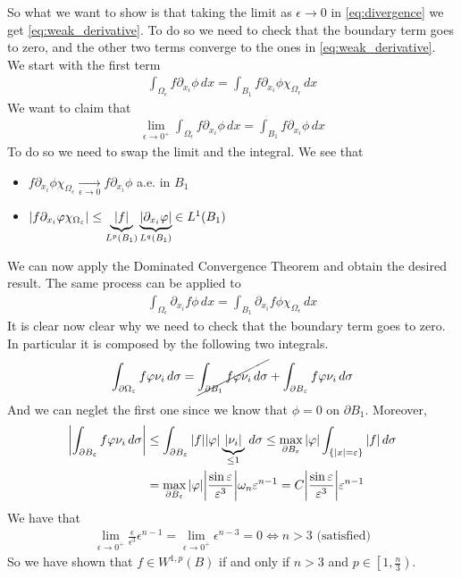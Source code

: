 So what we want to show is that taking the limit as \(\epsilon \to 0\) in \eqref{eq:divergence} we get \eqref{eq:weak_derivative}. 
To do so we need to check that the boundary term goes to zero, and the other two terms converge to the ones in \eqref{eq:weak_derivative}. \\
We start with the first term
\[ 
    \begin{split}
        \int_{\Omega_\epsilon} f \partial_{x_i} \phi \, dx = \int_{B_1} f \partial_{x_i} \phi \chi_{\Omega_\epsilon} \, dx
    \end{split}
\]
We want to claim that 
\[
    \begin{split}
        \lim_{\epsilon \to 0^+} \int_{\Omega_\epsilon} f \partial_{x_i} \phi \, dx = \int_{B_1} f \partial_{x_i} \phi \, dx
    \end{split}
\]
To do so we need to swap the limit and the integral. We see that 
\begin{itemize}
    \item \(f \partial_{x_i} \phi \chi_{\Omega_\epsilon} \underset{\epsilon \to 0}{\longrightarrow} f \partial_{x_i} \phi\) a.e. in \(B_1\)
    \item \(\abs{f \partial_{x_i} \phi \chi_{\Omega_\epsilon}} \leq \underbrace{\abs{f}}_{L^p(B_1)} \underbrace{\abs{\partial_{x_i} \phi}}_{L^q(B_1)} \in L^1(B_1)\)
\end{itemize}
We can now apply the Dominated Convergence Theorem and obtain the desired result. 
The same process can be applied to
\[
    \begin{split}
        \int_{\Omega_\epsilon} \partial_{x_i} f \phi \, dx = \int_{B_1} \partial_{x_i} f \phi \chi_{\Omega_\epsilon} \, dx
    \end{split}
\]
It is clear now clear why we need to check that the boundary term goes to zero. In particular it is composed by the following two integrals.
\[
    \begin{split}
        \int_{\partial\Omega_\epsilon} f \phi \nu_i \, d\sigma = \cancel{\int_{\partial B_1} f \phi \nu_i \, d\sigma} + \int_{\partial B_\epsilon} f \phi \nu_i \, d\sigma    
    \end{split}
\]
And we can neglet the first one since we know that $\phi = 0$ on $\partial B_1$.
Moreover,
\[
    \begin{split}
        \abs{\int_{\partial B_\epsilon} f \phi \nu_i \, d\sigma} & \leq \int_{\partial B_\epsilon} \abs{f} \abs{\phi} \underbrace{\abs{\nu_i}}_{\leq 1} \, d\sigma \leq \max_{\partial B_\epsilon} \abs{\phi} \int_{\{ \abs{x} = \epsilon \}} \abs{f} \, d\sigma \\
                                                                 & = \max_{\partial B_\epsilon} \abs{\phi} \abs{\frac{\sin\epsilon}{\epsilon^3}} \omega_n \epsilon^{n-1} = C \abs{\frac{\sin\epsilon}{\epsilon^3}} \epsilon^{n-1}
    \end{split}
\]
We have that 
\[
    \begin{split}
        \lim_{\epsilon \to 0^+} \frac{\epsilon}{\epsilon^3} \epsilon^{n-1} = \lim_{\epsilon \to 0^+} \epsilon^{n-3} = 0 \iff n > 3 \text{ (satisfied)}
    \end{split}
\]
So we have shown that $f \in W^{1, p}(B)$ if and only if $n>3$ and $p \in \left[1, \frac{n}{3}\right)$.

